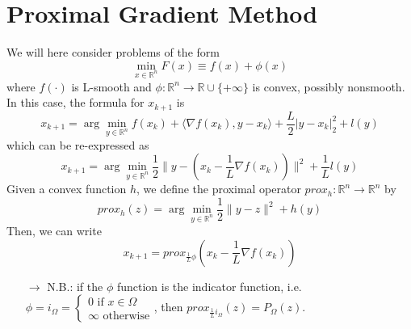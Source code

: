 \documentclass[12pt, openany]{report}
\theoremstyle{definition}
\begin{document}
\section{Proximal Gradient Method}
We will here consider problems of the form 
\begin{equation}
    \min_{x\in \mathbb{R}^n} F(x) \equiv f(x) + \phi(x)
\end{equation}
where \(f(\cdot)\) is L-smooth and \(\phi :\mathbb{R}^n\rightarrow \mathbb{R}\cup \{+\infty\}\) is convex, possibly nonsmooth. \\
In this case, the formula for \(x_{k+1}\) is 
\begin{equation}
    x_{k+1} = \arg\min_{y\in \mathbb{R}^n} f(x_k) + \langle \nabla f(x_k),y-x_k\rangle + \frac{L}{2}\lvert y-x_k\rvert_2^2 + l(y)
\end{equation}
which can be re-expressed as 
\begin{equation}
    x_{k+1} = \arg\min_{y\in \mathbb{R}^n} \frac{1}{2}\lVert y-(x_k-\frac{1}{L}\nabla f(x_k))\rVert^2+\frac{1}{L}l(y)
\end{equation}
Given a convex function \(h\), we define the proximal operator \(prox_h:\mathbb{R}^n\rightarrow\mathbb{R}^n\) by
\begin{equation}
    prox_h(z) = \arg \min_{y\in \mathbb{R}^n}\frac{1}{2}\lVert y-z\rVert^2+h(y)
\end{equation}
Then, we can write
\begin{equation}
    x_{k+1} = prox_{\frac{1}{L}\phi}\left(x_k-\frac{1}{L}\nabla f(x_k)\right)
\end{equation}
\begin{itemize}
    \item [\(\rightarrow\)] N.B.: if the \(\phi\) function is the indicator function, i.e. \(\phi=i_\Omega = \begin{cases}
        0 \text{ if } x\in \Omega\\ \infty \text{ otherwise}
    \end{cases}\), then \(prox_{\frac{1}{L}i_\Omega}(z) = P_\Omega(z)\).
\end{itemize}
\end{document}
